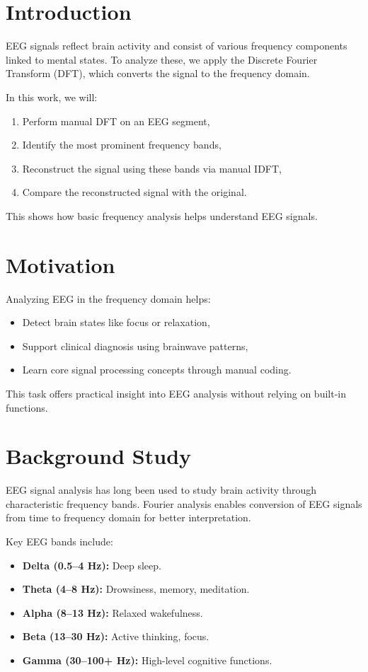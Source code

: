 \documentclass[12pt, a4paper]{article}
\begin{document}
\section{Introduction}

\label{sec:introduction}
EEG signals reflect brain activity and consist of various frequency components linked to mental states. To analyze these, we apply the Discrete Fourier Transform (DFT), which converts the signal to the frequency domain.

In this work, we will:
\begin{enumerate}
    \item Perform manual DFT on an EEG segment,
    \item Identify the most prominent frequency bands,
    \item Reconstruct the signal using these bands via manual IDFT,
    \item Compare the reconstructed signal with the original.
\end{enumerate}

This shows how basic frequency analysis helps understand EEG signals.

\section{Motivation}
\label{sec:motivation}
Analyzing EEG in the frequency domain helps:
\begin{itemize}
    \item Detect brain states like focus or relaxation,
    \item Support clinical diagnosis using brainwave patterns,
    \item Learn core signal processing concepts through manual coding.
\end{itemize}

This task offers practical insight into EEG analysis without relying on built-in functions.
\section{Background Study}
\label{sec:background_study}
EEG signal analysis has long been used to study brain activity through characteristic frequency bands. Fourier analysis enables conversion of EEG signals from time to frequency domain for better interpretation.

Key EEG bands include:
\begin{itemize}
    \item \textbf{Delta (0.5–4 Hz):} Deep sleep.
    \item \textbf{Theta (4–8 Hz):} Drowsiness, memory, meditation.
    \item \textbf{Alpha (8–13 Hz):} Relaxed wakefulness.
    \item \textbf{Beta (13–30 Hz):} Active thinking, focus.
    \item \textbf{Gamma (30–100+ Hz):} High-level cognitive functions.
\end{itemize}
\end{document}
